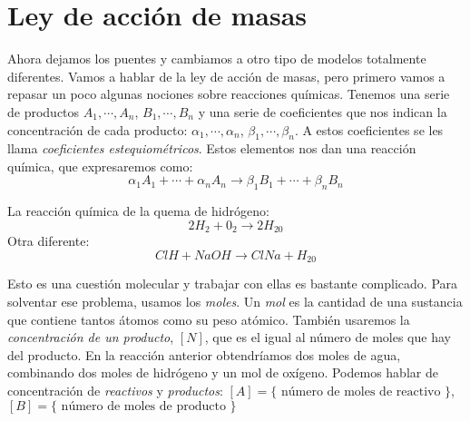 \chapter{Ley de acción de masas}

Ahora dejamos los puentes y cambiamos a otro tipo de modelos totalmente diferentes. Vamos a hablar de la ley de acción de masas, pero primero vamos a repasar un poco algunas nociones sobre reacciones químicas. Tenemos una serie de productos $A_1,\cdots, A_n$, $B_1,\cdots, B_n$ y una serie de coeficientes que nos indican la concentración de cada producto: $\alpha_1,\cdots, \alpha_n$, $\beta_1,\cdots, \beta_n$. A estos coeficientes se les llama \textit{coeficientes estequiométricos}. Estos elementos nos dan una reacción química, que expresaremos como:
\[
\alpha_1A_1+\cdots+\alpha_nA_n \longrightarrow \beta_1B_1+\cdots+\beta_nB_n
\]
\begin{example} La reacción química de la quema de hidrógeno:
\[
2H_2+0_2\longrightarrow 2H_20
\]
Otra diferente:
\[
ClH+NaOH \longrightarrow ClNa+H_20
\]
\end{example}

Esto es una cuestión molecular y trabajar con ellas es bastante complicado. Para solventar ese problema, usamos los \textit{moles}. Un \textit{mol} es la cantidad de una sustancia que contiene tantos átomos como su peso atómico. También usaremos la \textit{concentración de un producto}, $[N]$, que es el igual al número de moles que hay del producto. En la reacción anterior obtendríamos dos moles de agua, combinando dos moles de hidrógeno y un mol de oxígeno. Podemos hablar de concentración de \textit{reactivos} y \textit{productos}: $[A] = \{ \text{ número de moles de reactivo } \}$, $[B] = \{ \text{ número de moles de producto } \}$

